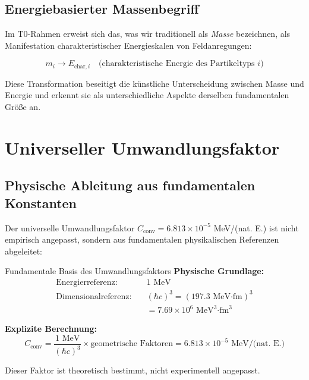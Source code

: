 \documentclass[12pt,a4paper]{article}
\begin{document}
	\subsection{Energiebasierter Massenbegriff}
	\label{subsec:energy_based_mass}
	
	Im T0-Rahmen erweist sich das, was wir traditionell als \textit{Masse} bezeichnen, als Manifestation charakteristischer Energieskalen von Feldanregungen:
	
\begin{equation}
	\boxed{m_i \rightarrow E_{\text{char},i} \quad \text{(charakteristische Energie des Partikeltyps $i$)}}
	\label{eq:mass_to_energy}
\end{equation}

Diese Transformation beseitigt die k\"u{}nstliche Unterscheidung zwischen Masse und Energie und erkennt sie als unterschiedliche Aspekte derselben fundamentalen Gr\"o{}\ss{}e an.

\section{Universeller Umwandlungsfaktor}
\label{sec:universal_conversion_factor}

\subsection{Physische Ableitung aus fundamentalen Konstanten}
\label{subsec:physical_derivation}

Der universelle Umwandlungsfaktor $C_{\text{conv}} = 6.813 \times 10^{-5}$ MeV/(nat. E.) ist nicht empirisch angepasst, sondern aus fundamentalen physikalischen Referenzen abgeleitet:

\begin{wichtig}{Fundamentale Basis des Umwandlungsfaktors}{}
	\textbf{Physische Grundlage:}
	\begin{align}
		\text{Energierreferenz:} &\quad 1 \text{ MeV} \\
		\text{Dimensionalreferenz:} &\quad (\hbar c)^3 = (197.3 \text{ MeV·fm})^3 \\
		&\quad = 7.69 \times 10^6 \text{ MeV}^3\text{·fm}^3
	\end{align}
	
	\textbf{Explizite Berechnung:}
	\begin{equation}
		C_{\text{conv}} = \frac{1 \text{ MeV}}{(\hbar c)^3} \times \text{geometrische Faktoren} = 6.813 \times 10^{-5} \text{ MeV/(nat. E.)}
	\end{equation}
	
	Dieser Faktor ist theoretisch bestimmt, nicht experimentell angepasst.
\end{wichtig}
\end{document}
